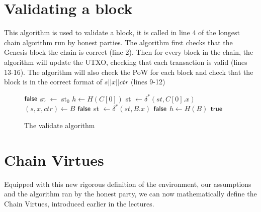 \section{Validating a block}
This algorithm is used to validate a block, it is called in line 4 of the longest chain algorithm run by honest parties. The algorithm first checks that the Genesis block the chain is correct (line 2). Then for every block in the chain, the algorithm will update the UTXO, checking that each transaction is valid (lines 13-16). The algorithm will also check the PoW for each block and check that the block is in the correct format of $s || x || ctr$ (lines 9-12)
\begin{figure}[H]
\begin{algorithm}[H]
    \caption{\label{alg.validate} The validate algorithm}
    \begin{algorithmic}[1]
         
            \State\Return$\textsf{false}$
        \EndIf
        \State st $\leftarrow$ st$_0$ 
        \State $h \leftarrow H(C[0])$
        \State st $\leftarrow \delta^*(st, C[0].x)$
         
            \State $(s, x, ctr) \leftarrow B$
             
                \State\Return$\textsf{false}$
            \EndIf
            \State st $\leftarrow \delta^*(st, B.x)$ 
                \State\Return$\textsf{false}$
            \EndIf
            \State $h \leftarrow H(B)$
        \EndFor
        \State\Return$\textsf{true}$
    \EndFunction
    \end{algorithmic}
\end{algorithm}
\end{figure}


\section{Chain Virtues}
Equipped with this new rigorous definition of the environment, our assumptions and the algorithm ran by the honest party, we can now mathematically define the Chain Virtues, introduced earlier in the lectures.

